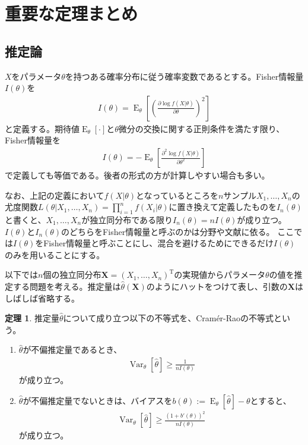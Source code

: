 \documentclass[11pt]{ltjsarticle}
\theoremstyle{definition}
\newtheorem{theorem}{定理}[section]
\DeclareMathOperator{\E}{E}
\DeclareMathOperator{\Var}{Var}
\begin{document}
\tableofcontents

\section{重要な定理まとめ}
\subsection{推定論}
$X$をパラメータ$\theta$を持つある確率分布に従う確率変数であるとする。Fisher情報量$I(\theta)$を
\begin{align}
        I(\theta) = \E_\theta\left[\left(\frac{\partial \log f(X|\theta)}{\partial \theta}\right)^2\right]
\end{align}
と定義する。期待値$\E_\theta[\cdot]$と$\theta$微分の交換に関する正則条件を満たす限り、Fisher情報量を
\begin{align}
    I(\theta) = -\E_\theta\left[\frac{\partial^2 \log f(X|\theta)}{\partial \theta^2}\right]
\end{align}
で定義しても等価である。後者の形式の方が計算しやすい場合も多い。

なお、上記の定義において$f(X|\theta)$となっているところを$n$サンプル$X_1,\ldots,X_n$の尤度関数$L(\theta|X_1,\ldots,X_n)=\prod_{i=1}^nf(X_i|\theta)$に置き換えて定義したものを$I_n(\theta)$と書くと、$X_1, \ldots, X_n$が独立同分布である限り$I_n(\theta)=nI(\theta)$が成り立つ。
$I(\theta)$と$I_n(\theta)$のどちらをFisher情報量と呼ぶのかは分野や文献に依る。
ここでは$I(\theta)$をFisher情報量と呼ぶことにし、混合を避けるためにできるだけ$I(\theta)$のみを用いることにする。

以下では$n$個の独立同分布$\bm{X}=(X_1, \ldots,X_n)^{\mathrm{T}}$の実現値からパラメータ$\theta$の値を推定する問題を考える。推定量は$\widehat{\theta}(\bm{X})$のようにハットをつけて表し、引数の$\bm{X}$はしばしば省略する。

\begin{theorem}
    推定量$\widehat{\theta}$について成り立つ以下の不等式を、Cram\'{e}r-Raoの不等式という。
    \begin{enumerate}[(1)]
        \item $\widehat{\theta}$が不偏推定量であるとき、
        \begin{align}
            \Var_\theta[\widehat{\theta}] \ge \frac{1}{nI(\theta)}
        \end{align}
        が成り立つ。
        \item $\widehat{\theta}$が不偏推定量でないときは、バイアスを$b(\theta):=\E_\theta[\widehat{\theta}]-\theta$とすると、
        \begin{align}
            \Var_\theta[\widehat{\theta}]\ge\frac{(1 + b'(\theta))^2}{nI(\theta)}
        \end{align}
        が成り立つ。
    \end{enumerate}
\end{theorem}
\end{document}

